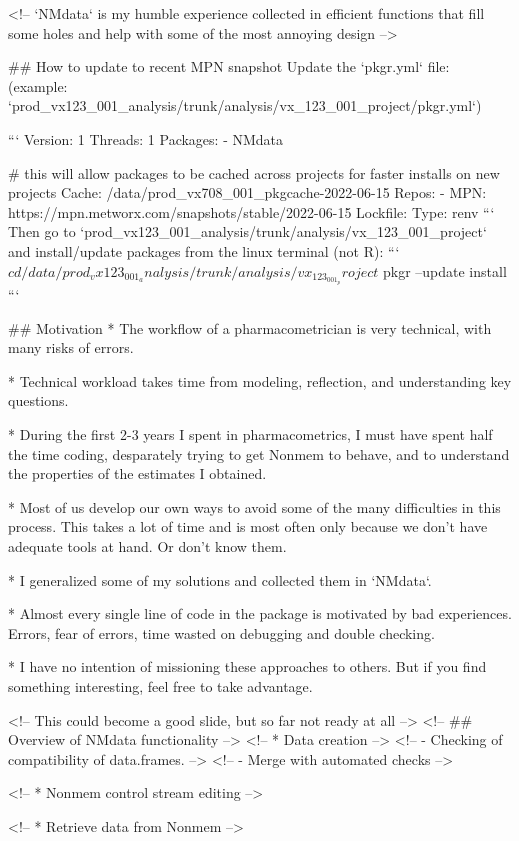 <!-- `NMdata` is my humble experience collected in efficient functions that fill some holes and help with some of the most annoying design -->

## How to update to recent MPN snapshot
Update the `pkgr.yml` file: 
(example: `prod_vx123_001_analysis/trunk/analysis/vx_123_001_project/pkgr.yml`)

```
Version: 1
Threads: 1
Packages:
  - NMdata

# this will allow packages to be cached across projects for faster installs on new projects
Cache: /data/prod_vx708_001_pkgcache-2022-06-15
Repos:
  - MPN: https://mpn.metworx.com/snapshots/stable/2022-06-15
Lockfile:
    Type: renv
```
Then go to `prod_vx123_001_analysis/trunk/analysis/vx_123_001_project` and install/update packages from the linux terminal (not R):
```
$ cd /data/prod_vx123_001_analysis/trunk/analysis/vx_123_001_project
$ pkgr --update install
```

## Motivation
* The workflow of a pharmacometrician is very technical, with many risks of errors.

* Technical workload takes time from modeling, reflection, and
understanding key questions. 

* During the first 2-3 years I spent in pharmacometrics, I must have spent half the time coding, desparately trying to get Nonmem to behave, and to understand the properties of the estimates I obtained.

* Most of us develop our own ways to avoid some of the many
difficulties in this process. This takes a lot of time and is most
often only because we don't have adequate tools at hand. Or don't know them.

* I generalized some of my solutions and collected them in `NMdata`.

* Almost every single line of code in the package is motivated by bad
experiences. Errors, fear of errors, time wasted on debugging and
double checking.

* I have no intention of missioning these approaches to others. But if
you find something interesting, feel free to take advantage.


<!-- This could become a good slide, but so far not ready at all -->
<!-- ## Overview of NMdata functionality -->
<!-- * Data creation -->
<!-- - Checking of compatibility of data.frames. -->
<!-- - Merge with automated checks  -->

<!-- * Nonmem control stream editing -->

<!-- * Retrieve data from Nonmem -->




